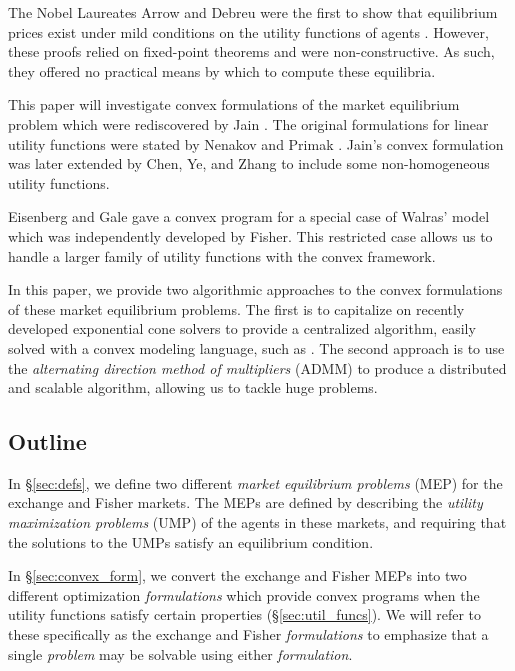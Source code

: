 \documentclass[12pt]{article}
\begin{document}
The Nobel Laureates Arrow and Debreu were the first to show that equilibrium
prices exist under mild conditions on the utility functions of agents \cite{arrow1954existence}.
However, these proofs relied on fixed-point theorems and were non-constructive.
As such, they offered no practical means by which to compute these equilibria.

This paper will investigate convex formulations of the market
equilibrium problem which were rediscovered by Jain \cite{jain2007polynomial}.
The original formulations for linear utility functions
were stated by Nenakov and Primak \cite{nenakov1983algorithm}.
Jain's convex formulation was later extended by Chen, Ye, and Zhang \cite{chen2007note, chen2010equilibrium} to include some non-homogeneous
utility functions.

Eisenberg and Gale \cite{eisenberg1959consensus, gale1960theory, eisenberg1961aggregation} gave a convex program for a special case of Walras' model which was independently developed by Fisher. %
This restricted case allows us to handle a larger family of utility functions
with the convex framework.

In this paper, we provide two algorithmic approaches to the convex formulations of these market equilibrium problems. The first is to capitalize on recently developed exponential cone solvers \cite{scs} to provide a centralized algorithm, easily solved with a convex modeling language, such as \cite{cvxpy, cvx}. The second approach is to use the \emph{alternating direction method of multipliers} (ADMM) \cite{boyd2011distributed} to produce a distributed and scalable algorithm, allowing us to tackle huge problems.

\subsection{Outline}
In \S\ref{sec:defs}, we define two different \emph{market equilibrium problems} (MEP) for the exchange and Fisher markets.
The MEPs are defined by describing the \emph{utility maximization problems} (UMP) of the agents in these markets, and requiring that the solutions
to the UMPs satisfy an equilibrium condition.

In \S\ref{sec:convex_form}, we convert the exchange and Fisher MEPs into two different optimization \emph{formulations} which provide convex programs when the utility functions satisfy certain properties (\S\ref{sec:util_funcs}).
We will refer to these specifically as the exchange and Fisher \emph{formulations} to emphasize that a single \emph{problem} may be solvable
using either \emph{formulation}.
\end{document}

